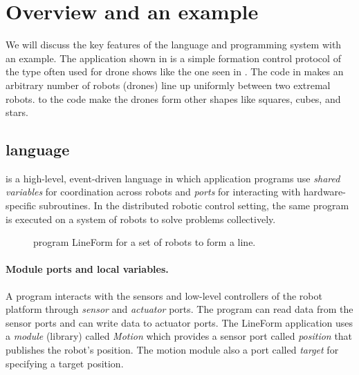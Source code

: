 \section{Overview and an example}
\label{sec:overview}

\newcommand{\LineForm}{\textsf{LineForm}\xspace}

We will discuss the key features of the \lgname language and programming system with an example.
The \lgname application shown in  is a simple formation control protocol of the type often used for drone shows like the one seen in .
The code in  makes an arbitrary number of robots (drones) line up uniformly between two extremal robots.
 to the code make the drones form other shapes like squares, cubes, and stars.

\subsection{\lgname language}
\label{sec:koord-language}
\lgname is a high-level, event-driven language in which application programs use \emph{shared variables} for coordination across robots
and \emph{ports} for interacting with hardware-specific subroutines.
In the distributed robotic control setting, the same \lgname program is executed on a system of robots to solve problems collectively.

\begin{figure}[h!]
    {
        
    }
    {
        
    }
    \caption{\lgname program \LineForm for a set of robots to form a line.}
    \label{fig:lineform}
\end{figure}

\paragraph{Module ports and local variables.}
A \lgname program interacts with the sensors and low-level controllers of the robot platform through \emph{sensor} and \emph{actuator} ports.
The program can read data from the sensor ports and can write data to actuator ports.
%
The \LineForm application uses a \emph{module} (library) called \emph{Motion} which provides a sensor port called \emph{position} that publishes the robot's position.
The motion module also a port called \emph{target} for specifying a target position.

